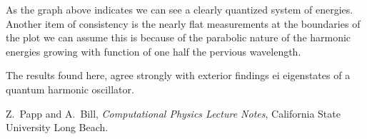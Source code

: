 \documentclass[12pt,letterpaper,notitlepage]{article}
\begin{document}
As the graph above indicates we can see a clearly quantized system of energies. Another item of consistency is the nearly flat measurements at the boundaries of the plot we can assume this is because of the parabolic nature of the harmonic energies growing with function of one half the pervious wavelength.

The results found here, agree strongly with exterior findings ei eigenstates of a quantum harmonic oscillator.  


\begin{thebibliography}{}


	Z.~Papp and A.~Bill, {\it Computational Physics Lecture Notes}, California State University Long Beach.

\end{thebibliography}
\end{document}
